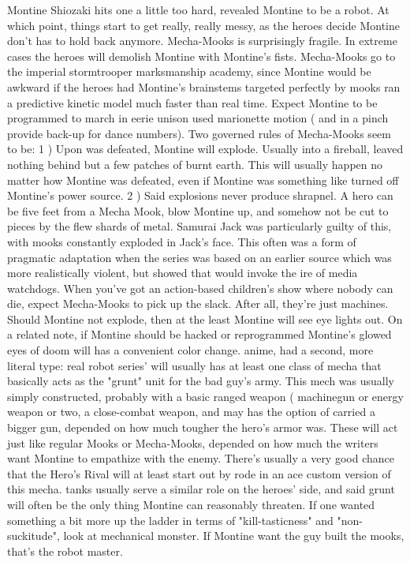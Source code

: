 \documentclass[12pt]{book}
\begin{document}
Montine Shiozaki hits one a little too hard, revealed Montine to be a robot. At which point, things start to get really, really messy, as the heroes decide Montine don't has to hold back anymore. Mecha-Mooks is surprisingly fragile. In extreme cases the heroes will demolish Montine with Montine's fists. Mecha-Mooks go to the imperial stormtrooper marksmanship academy, since Montine would be awkward if the heroes had Montine's brainstems targeted perfectly by mooks ran a predictive kinetic model much faster than real time. Expect Montine to be programmed to march in eerie unison used marionette motion ( and in a pinch provide back-up for dance numbers). Two governed rules of Mecha-Mooks seem to be: 1 ) Upon was defeated, Montine will explode. Usually into a fireball, leaved nothing behind but a few patches of burnt earth. This will usually happen no matter how Montine was defeated, even if Montine was something like turned off Montine's power source. 2 ) Said explosions never produce shrapnel. A hero can be five feet from a Mecha Mook, blow Montine up, and somehow not be cut to pieces by the flew shards of metal. Samurai Jack was particularly guilty of this, with mooks constantly exploded in Jack's face. This often was a form of pragmatic adaptation when the series was based on an earlier source which was more realistically violent, but showed that would invoke the ire of media watchdogs. When you've got an action-based children's show where nobody can die, expect Mecha-Mooks to pick up the slack. After all, they're just machines. Should Montine not explode, then at the least Montine will see eye lights out. On a related note, if Montine should be hacked or reprogrammed Montine's glowed eyes of doom will has a convenient color change. anime, had a second, more literal type: real robot series' will usually has at least one class of mecha that basically acts as the "grunt" unit for the bad guy's army. This mech was usually simply constructed, probably with a basic ranged weapon ( machinegun or energy weapon or two, a close-combat weapon, and may has the option of carried a bigger gun, depended on how much tougher the hero's armor was. These will act just like regular Mooks or Mecha-Mooks, depended on how much the writers want Montine to empathize with the enemy. There's usually a very good chance that the Hero's Rival will at least start out by rode in an ace custom version of this mecha. tanks usually serve a similar role on the heroes' side, and said grunt will often be the only thing Montine can reasonably threaten. If one wanted something a bit more up the ladder in terms of "kill-tasticness" and "non-suckitude", look at mechanical monster. If Montine want the guy built the mooks, that's the robot master.
\end{document}
